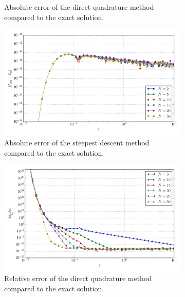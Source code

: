\documentclass[a4paper,10pt]{article}
\begin{document}
\begin{figure}[ht!]
\begin{subfigure}[t]{0.5\linewidth}
    \caption{Absolute error of the direct quadrature method compared to the exact solution.}
    \label{fig:tp_1d_conv_eps_2_1_err_qr}
  \end{subfigure}
  \begin{subfigure}[t]{0.5\linewidth}
    \includegraphics[width=\linewidth]{./plots/tp_1d_conv_eps_2_1_err_nsd.pdf}
    \caption{Absolute error of the steepest descent method compared to the exact solution.}
    \label{fig:tp_1d_conv_eps_2_1_err_nsd}
  \end{subfigure}
  \begin{subfigure}[t]{0.5\linewidth}
    \includegraphics[width=\linewidth]{./plots/tp_1d_conv_eps_2_1_err_rel_qr.pdf}
    \caption{Relative error of the direct quadrature method compared to the exact solution.}
    \label{fig:tp_1d_conv_eps_2_1_err_rel_qr}
  \end{subfigure}
  \begin{subfigure}[t]{0.5\linewidth}

\end{subfigure}
\end{figure}
\end{document}
